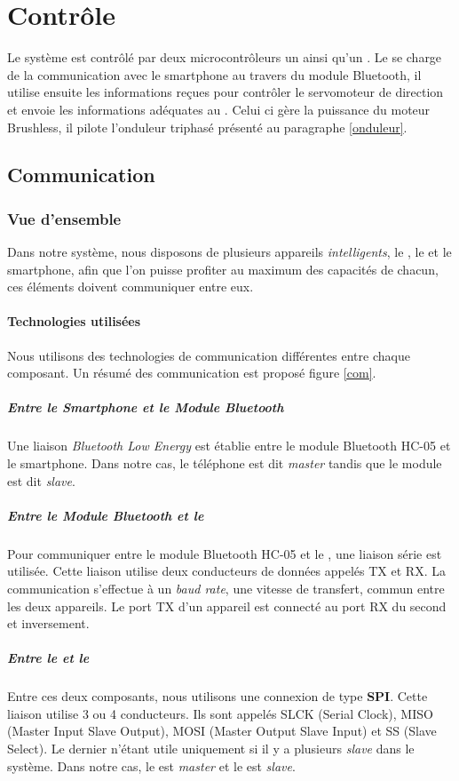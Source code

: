 	\chapter{Contrôle}
	Le système est contrôlé par deux microcontrôleurs un \pic ainsi qu'un \dspic. Le \pic se charge de la communication avec le smartphone au travers du module Bluetooth, il utilise ensuite les informations reçues pour contrôler le servomoteur de direction et envoie les informations adéquates au \dspic. Celui ci gère la puissance du moteur Brushless, il pilote l'onduleur triphasé présenté au paragraphe \ref{onduleur}.
		\section{Communication}
			\subsection{Vue d'ensemble}
				Dans notre système, nous disposons de plusieurs appareils \textit{intelligents}, le \pic , le \dspic et le smartphone, afin que l'on puisse profiter au maximum des capacités de chacun, ces éléments doivent communiquer entre eux.
				\subsubsection{Technologies utilisées}
				Nous utilisons des technologies de communication différentes entre chaque composant. Un résumé des communication est proposé figure \ref{com}.
				\paragraph{Entre le \textit{Smartphone} et le \textit{Module Bluetooth}} Une liaison \textit{Bluetooth Low Energy} est établie entre le module Bluetooth HC-05 et le smartphone. Dans notre cas, le téléphone est dit \textit{master} tandis que le module est dit \textit{slave}.
				\paragraph{Entre le \textit{Module Bluetooth} et le \textit{\pic} } Pour communiquer entre le module Bluetooth HC-05 et le \pic, une liaison série est utilisée. Cette liaison utilise deux conducteurs de données appelés TX et RX. La communication s'effectue à un \textit{baud rate}, une vitesse de transfert, commun entre les deux appareils. Le port TX d'un appareil est connecté au port RX du second et inversement.
				\paragraph{Entre le \textit{\dspic} et le \textit{\pic}} Entre ces deux composants, nous utilisons une connexion de type \textbf{SPI}. Cette liaison utilise 3 ou 4 conducteurs. Ils sont appelés SLCK (\textsf{Serial Clock}), MISO (\textsf{Master Input Slave Output}), MOSI (\textsf{Master Output Slave Input})  et SS (\textsf{Slave Select}). Le dernier n'étant utile uniquement si il y a plusieurs \textit{slave} dans le système. Dans notre cas, le \pic est \textit{master} et le \dspic est \textit{slave}.
				
